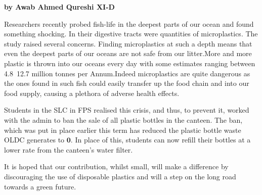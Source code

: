 \documentclass{article}
\date{January 2020}
\begin{document}
\maketitle
\large 


\textbf{by Awab Ahmed Qureshi XI-D}

Researchers recently probed fish-life in the deepest parts of our ocean and found something shocking. In their digestive tracts were quantities of microplastics. The study raised several concerns. Finding microplastics at such a depth means that even the deepest parts of our oceans are not safe from our litter.More and more plastic is thrown into our oceans every day with some estimates ranging between 4.8~12.7 million tonnes per Annum.\newline Indeed microplastics are quite dangerous as the ones found in such fish could easily transfer up the food chain and into our food supply, causing a plethora of adverse health effects.

Students in the SLC in FPS realised this crisis, and thus, to prevent it, worked with the admin to ban the sale of all plastic bottles in the canteen. The ban, which was put in place earlier this term has reduced the plastic bottle waste OLDC generates to $\boldsymbol{0}$. In place of this, students can now refill their bottles at a lower rate from the canteen's water filter.

It is hoped that our contribution, whilst small, will make a difference by discouraging the use of disposable plastics and will a step on the long road towards a green future. 



\end{document}
